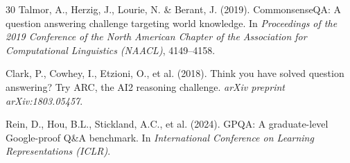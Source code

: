 \documentclass[12pt,a4paper]{article}
\begin{document}
\begin{thebibliography}{30}
Talmor, A., Herzig, J., Lourie, N. \& Berant, J. (2019). CommonsenseQA: A question answering challenge targeting world knowledge. In \textit{Proceedings of the 2019 Conference of the North American Chapter of the Association for Computational Linguistics (NAACL)}, 4149--4158.

Clark, P., Cowhey, I., Etzioni, O., et al. (2018). Think you have solved question answering? Try ARC, the AI2 reasoning challenge. \textit{arXiv preprint arXiv:1803.05457}.

Rein, D., Hou, B.L., Stickland, A.C., et al. (2024). GPQA: A graduate-level Google-proof Q\&A benchmark. In \textit{International Conference on Learning Representations (ICLR)}.

\end{thebibliography}
\end{document}

